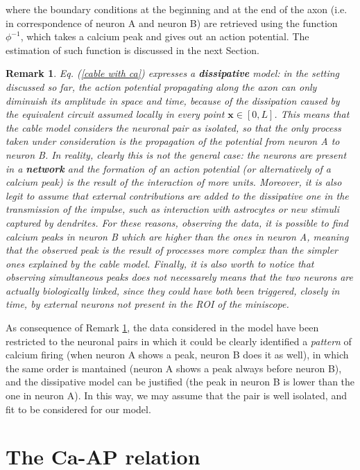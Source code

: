 \documentclass[12pt, a4paper]{report}
\newtheorem{remark}{Remark}
\begin{document}
where the boundary conditions at the beginning and at the end of the axon (i.e. in correspondence of neuron A and neuron B) are retrieved using the  function $\phi^{-1}$, which takes a  calcium peak  and gives out an action potential. The estimation of such function is discussed in the next Section.

\begin{remark}\label{remark cc}
	Eq. (\ref{cable with ca}) expresses a \textbf{dissipative} model: in the setting discussed so far, the action potential propagating along the axon can only diminuish its amplitude in space and time, because of the dissipation caused by the equivalent circuit assumed locally in every point $\textbf{x} \in [0,L]$. This means that the cable model considers the neuronal pair as isolated, so that the only process taken under consideration is the propagation of the potential from neuron A to neuron B. In reality, clearly this is not the general case: the neurons are present in a \textbf{network} and the formation of an action potential (or alternatively of a calcium peak) is the result of the interaction of more units. Moreover, it is also legit to assume that external contributions are added to the dissipative one in the transmission of the impulse, such as interaction with astrocytes or new stimuli captured by dendrites. For these reasons, observing the data, it is possible to find calcium peaks in neuron B which are higher than the ones in neuron A, meaning that the observed peak is the result of processes more complex than the simpler ones explained by the cable model. Finally, it is also worth to notice that observing simultaneous peaks does not necessarely means that the two neurons are actually biologically linked, since they could have both  been triggered, closely in time, by external neurons not present in the ROI  of the miniscope.
\end{remark}


As consequence of Remark \ref{remark cc}, the data considered in the model have been restricted to the neuronal pairs in which it could be clearly identified a \textit{pattern} of calcium firing (when neuron A shows a peak, neuron B does it as well), in which the same order is mantained (neuron A shows a peak always before neuron B), and the dissipative model can be justified (the peak in neuron B is lower than the one in neuron A). In this way, we may assume that the pair is well isolated, and fit to be considered for our model.

\section{The Ca-AP relation}
\end{document}
